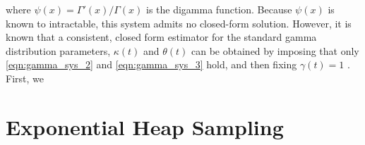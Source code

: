 \documentclass[12pt]{article}
\begin{document}
\noindent where $\psi(x) = \Gamma'(x)/\Gamma(x)$ is the digamma function. Because $\psi(x)$ is known to intractable, this system admits no closed-form solution. However, it is known that a consistent, closed form estimator for the standard gamma distribution parameters, $\kappa(t)$ and $\theta(t)$ can be obtained by imposing that only \eqref{eqn:gamma_sys_2} and \eqref{eqn:gamma_sys_3} hold, and then fixing $\gamma(t) = 1$ \cite{gammapaper}. First, we 

\section{Exponential Heap Sampling}
\end{document}
